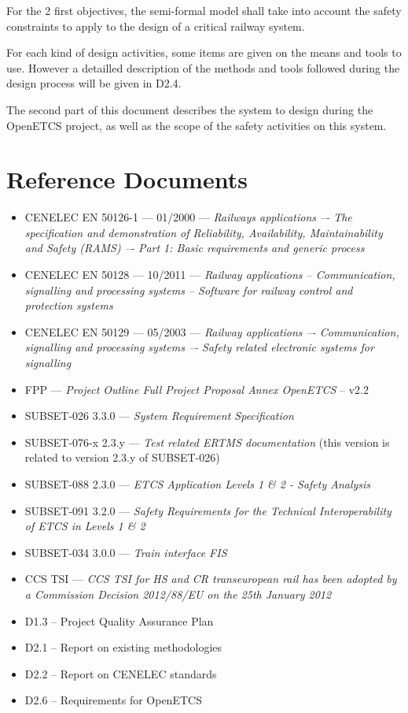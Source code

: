 For the 2 first objectives, the semi-formal  model  shall take into account the safety constraints to apply to the design of a critical railway system.

For each kind of design activities, some items are given on the means and tools to  use. However a detailled description of the methods and tools followed during the design process will be given in D2.4.

The second part of this document describes the system to design during the OpenETCS project, as well as the scope of the safety activities on this system.


\section{Reference Documents}
\begin{itemize}
\item CENELEC EN 50126-1 --- 01/2000 --- \emph{Railways applications –- The specification and
demonstration of Reliability, Availability, Maintainability and Safety (RAMS) –- Part 1:
Basic requirements and generic process}
\item CENELEC EN 50128 --- 10/2011 --- \emph{Railway applications -- Communication, signalling and
processing systems -- Software for railway control and protection systems}
\item CENELEC EN 50129 --- 05/2003 --- \emph{Railway applications –- Communication, signalling and
processing systems –- Safety related electronic systems for signalling}
\item FPP --- \emph{Project Outline Full Project Proposal Annex OpenETCS} -- v2.2
\item SUBSET-026 3.3.0 --- \emph{System Requirement Specification}
\item SUBSET-076-x 2.3.y --- \emph{Test related ERTMS documentation} (this version is related to version 2.3.y  of SUBSET-026)
\item SUBSET-088 2.3.0 --- \emph{ETCS Application Levels 1 \& 2 - Safety Analysis}
\item SUBSET-091 3.2.0 --- \emph{Safety Requirements for the Technical Interoperability
of ETCS in Levels 1 \& 2}
\item SUBSET-034 3.0.0 --- \emph{Train interface FIS}
\item CCS TSI --- \emph{ CCS TSI for HS and CR transeuropean rail has been adopted by a Commission Decision 2012/88/EU on the 25th January 2012}
\item D1.3 -- Project Quality Assurance Plan
\item D2.1 -- Report on existing methodologies 
\item D2.2 -- Report on CENELEC standards
\item D2.6 -- Requirements for OpenETCS
\end{itemize}

